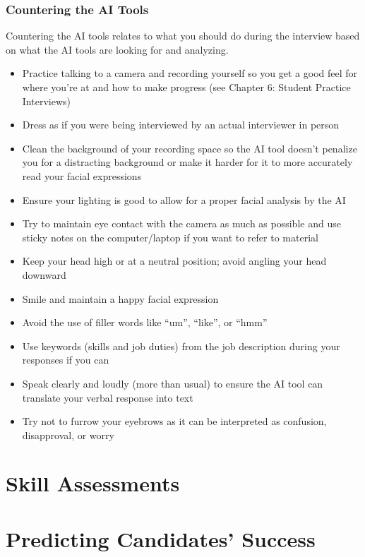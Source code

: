 \documentclass[
]{book}
\begin{document}
\hypertarget{countering-the-ai-tools}{%
\subsection{Countering the AI Tools}\label{countering-the-ai-tools}}

Countering the AI tools relates to what you should do during the interview based on what the AI tools are looking for and analyzing.

\begin{itemize}
\item
  Practice talking to a camera and recording yourself so you get a good feel for where you're at and how to make progress (see Chapter 6: Student Practice Interviews)
\item
  Dress as if you were being interviewed by an actual interviewer in person
\item
  Clean the background of your recording space so the AI tool doesn't penalize you for a distracting background or make it harder for it to more accurately read your facial expressions
\item
  Ensure your lighting is good to allow for a proper facial analysis by the AI
\item
  Try to maintain eye contact with the camera as much as possible and use sticky notes on the computer/laptop if you want to refer to material
\item
  Keep your head high or at a neutral position; avoid angling your head downward
\item
  Smile and maintain a happy facial expression
\item
  Avoid the use of filler words like ``um'', ``like'', or ``hmm''
\item
  Use keywords (skills and job duties) from the job description during your responses if you can
\item
  Speak clearly and loudly (more than usual) to ensure the AI tool can translate your verbal response into text
\item
  Try not to furrow your eyebrows as it can be interpreted as confusion, disapproval, or worry
\end{itemize}

\hypertarget{skill-assessments}{%
\chapter{Skill Assessments}\label{skill-assessments}}

\hypertarget{predicting-candidates-success}{%
\chapter{Predicting Candidates' Success}\label{predicting-candidates-success}}
\end{document}
